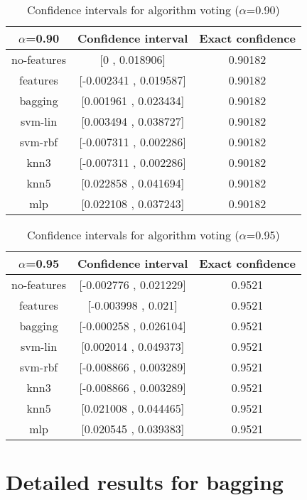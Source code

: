 \documentclass[a4paper,10pt]{article}
\begin{document}
\begin{table}[!htp]
\centering\small
\begin{tabular}{
|c|c|c|}
\hline
 $\alpha$=0.90 & Confidence interval & Exact confidence \\ \hline 
no-features & [0 , 0.018906] & 0.90182\\ \hline 
features & [-0.002341 , 0.019587] & 0.90182\\ \hline 
bagging & [0.001961 , 0.023434] & 0.90182\\ \hline 
svm-lin & [0.003494 , 0.038727] & 0.90182\\ \hline 
svm-rbf & [-0.007311 , 0.002286] & 0.90182\\ \hline 
knn3 & [-0.007311 , 0.002286] & 0.90182\\ \hline 
knn5 & [0.022858 , 0.041694] & 0.90182\\ \hline 
mlp & [0.022108 , 0.037243] & 0.90182\\ \hline 

\end{tabular}
\caption{Confidence intervals for algorithm voting ($\alpha$=0.90)}
\end{table}
\begin{table}[!htp]
\centering\small
\begin{tabular}{
|c|c|c|}
\hline
 $\alpha$=0.95 & Confidence interval & Exact confidence \\ \hline 
no-features & [-0.002776 , 0.021229] & 0.9521\\ \hline 
features & [-0.003998 , 0.021] & 0.9521\\ \hline 
bagging & [-0.000258 , 0.026104] & 0.9521\\ \hline 
svm-lin & [0.002014 , 0.049373] & 0.9521\\ \hline 
svm-rbf & [-0.008866 , 0.003289] & 0.9521\\ \hline 
knn3 & [-0.008866 , 0.003289] & 0.9521\\ \hline 
knn5 & [0.021008 , 0.044465] & 0.9521\\ \hline 
mlp & [0.020545 , 0.039383] & 0.9521\\ \hline 

\end{tabular}
\caption{Confidence intervals for algorithm voting ($\alpha$=0.95)}
\end{table}

 \clearpage 


\section{Detailed results for bagging}
\end{document}
